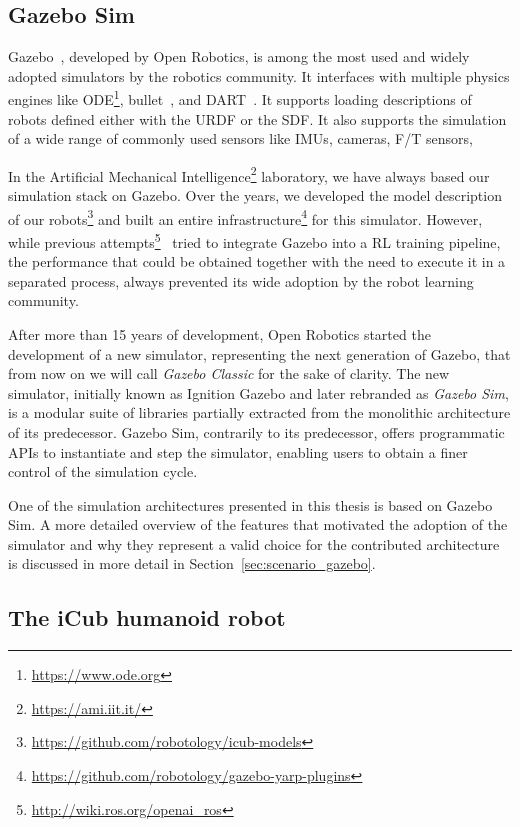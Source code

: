 \subsection{Gazebo Sim}

Gazebo~\parencite{koenig_design_2004}, developed by Open Robotics, is among the most used and widely adopted simulators by the robotics community.
It interfaces with multiple physics engines like ODE\footnote{\url{https://www.ode.org}}, bullet~\parencite{coumans_pybullet_2016}, and DART~\parencite{lee_dart_2018}.
It supports loading descriptions of robots defined either with the \ac{URDF} or the \ac{SDF}.
It also supports the simulation of a wide range of commonly used sensors like \acp{IMU}, cameras, \ac{F/T} sensors, \etc

In the Artificial Mechanical Intelligence\footnote{\url{https://ami.iit.it/}} laboratory, we have always based our simulation stack on Gazebo.
Over the years, we developed the model description of our robots\footnote{\url{https://github.com/robotology/icub-models}} and built an entire infrastructure\footnote{\url{https://github.com/robotology/gazebo-yarp-plugins}} for this simulator.
However, while previous attempts\footnote{\url{http://wiki.ros.org/openai_ros}}~\parencite{zamora_extending_2017,lopez_gym-gazebo2_2019} tried to integrate Gazebo into a \ac{RL} training pipeline, the performance that could be obtained together with the need to execute it in a separated process, always prevented its wide adoption by the robot learning community.

After more than 15 years of development, Open Robotics started the development of a new simulator, representing the next generation of Gazebo, that from now on we will call \emph{Gazebo Classic} for the sake of clarity.
The new simulator, initially known as Ignition Gazebo and later rebranded as \emph{Gazebo Sim}, is a modular suite of libraries partially extracted from the monolithic architecture of its predecessor.
Gazebo Sim, contrarily to its predecessor, offers programmatic \acp{API} to instantiate and step the simulator, enabling users to obtain a finer control of the simulation cycle.

One of the simulation architectures presented in this thesis is based on Gazebo Sim.
A more detailed overview of the features that motivated the adoption of the simulator and why they represent a valid choice for the contributed architecture is discussed in more detail in Section~\ref{sec:scenario_gazebo}.

\subsection{The iCub humanoid robot}

